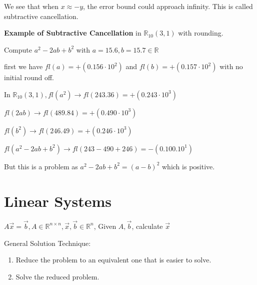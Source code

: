 \documentclass{article}
\begin{document}
We see that when $x \approx -y$, the error bound could approach infinity. This is called subtractive cancellation.

\vspace{0.2cm}

\textbf{Example of Subtractive Cancellation} in $\mathbb R_{10}(3, 1)$ with rounding.

Compute $a^2 - 2ab + b^2$ with $a = 15.6, b = 15.7 \in \mathbb R$

first we have $fl(a) = + (0.156 \cdot 10^2)$ and $fl(b) = + (0.157 \cdot 10^2)$ with no initial round off.

\vspace{0.2cm}

In $\mathbb R_{10}(3, 1), fl(a^2) \to fl(243.36) = +(0.243 \cdot 10^3)$

\hspace{1.7 cm} $fl(2ab) \to fl(489.84) = +(0.490 \cdot 10^3)$ 

\hspace{1.7 cm} $fl(b^2) \to fl(246.49) = +(0.246 \cdot 10^3)$ 

\hspace{1.7 cm} $fl(a^2 - 2ab + b^2) \to fl(243 - 490 + 246) = -(0.100.10^1)$ 

But this is a problem as $a^2 - 2ab + b^2 = (a - b)^2$ which is positive.

\section{Linear Systems}

$A \Vec{x} = \Vec{b}, A \in \mathbb R^{n \times n}, \Vec{x}, \Vec{b} \in \mathbb R^n$, Given $A ,\Vec{b}$, calculate $\Vec{x}$

General Solution Technique:

\begin{enumerate}
    \item Reduce the problem to an equivalent one that is easier to solve.
    
    \item Solve the reduced problem.
\end{enumerate}
\end{document}
